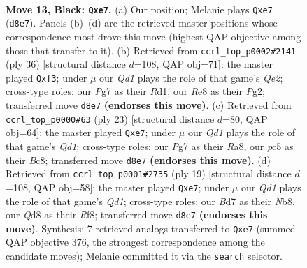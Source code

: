 \documentclass[11pt]{article}
\begin{document}
\begin{figure}[p]
\label{fig:thought-m23}
\end{figure}

\clearpage

\begin{figure}[p]\centering
\begin{subfigure}{0.46\textwidth}\centering
\resizebox{\linewidth}{!}{%
\newchessgame
\chessboard[
  setfen={r2qr1k1/1p1bBppp/p1n1p3/2Pp4/3Pn3/P1N2N1P/1P2BPP1/R2Q1RK1 b - - 0 13},
  showmover=false,
  pgfstyle=straightmove, color=movearrow, markmove={d8-e7}
]}
\caption{}
\end{subfigure}\hfill
\begin{subfigure}{0.46\textwidth}\centering
\resizebox{\linewidth}{!}{%
\newchessgame
\chessboard[
  setfen={2r1qrk1/4bppp/pn2pn2/1p2P3/3N4/P1N2bB1/1P2QPPP/R2R2K1 w - - 0 19},
  showmover=false,
  pgfstyle=straightmove, color=movearrow, markmove={e2-f3}
]}
\caption{}
\end{subfigure}
\\[4pt]
\begin{subfigure}{0.46\textwidth}\centering
\resizebox{\linewidth}{!}{%
\newchessgame
\chessboard[
  setfen={r1bq1rk1/pp2Bpp1/2n1p2p/2Pp4/3Pn3/P1N2N2/1P3PPP/2RQKB1R b K - 0 12},
  showmover=false,
  pgfstyle=straightmove, color=movearrow, markmove={d8-e7}
]}
\caption{}
\end{subfigure}\hfill
\begin{subfigure}{0.46\textwidth}\centering
\resizebox{\linewidth}{!}{%
\newchessgame
\chessboard[
  setfen={rn1q1rk1/pb2Bppp/1p2p3/2pn4/3P4/P1N1PN2/1P3PPP/2RQKB1R b K - 0 10},
  showmover=false,
  pgfstyle=straightmove, color=movearrow, markmove={d8-e7}
]}
\caption{}
\end{subfigure}
\caption{\textbf{Move 13, Black: \texttt{Qxe7}.} (a) Our position; Melanie plays \texttt{Qxe7} (\texttt{d8e7}). Panels (b)--(d) are the retrieved master positions whose correspondence most drove this move (highest QAP objective among those that transfer to it). (b) Retrieved from \texttt{ccrl\_top\_p0002\#2141} (ply 36) [structural distance $d$=108, QAP obj=71]: the master played \texttt{Qxf3}; under $\mu$ our \emph{Qd1} plays the role of that game's \emph{Qe2}; cross-type roles: our \emph{P}g7 as their \emph{R}d1, our \emph{R}e8 as their \emph{P}g2; transferred move \texttt{d8e7} \textbf{(endorses this move)}. (c) Retrieved from \texttt{ccrl\_top\_p0000\#63} (ply 23) [structural distance $d$=80, QAP obj=64]: the master played \texttt{Qxe7}; under $\mu$ our \emph{Qd1} plays the role of that game's \emph{Qd1}; cross-type roles: our \emph{P}g7 as their \emph{R}a8, our \emph{p}c5 as their \emph{B}c8; transferred move \texttt{d8e7} \textbf{(endorses this move)}. (d) Retrieved from \texttt{ccrl\_top\_p0001\#2735} (ply 19) [structural distance $d$=108, QAP obj=58]: the master played \texttt{Qxe7}; under $\mu$ our \emph{Qd1} plays the role of that game's \emph{Qd1}; cross-type roles: our \emph{B}d7 as their \emph{N}b8, our \emph{Q}d8 as their \emph{R}f8; transferred move \texttt{d8e7} \textbf{(endorses this move)}. Synthesis: 7 retrieved analogs transferred to \texttt{Qxe7} (summed QAP objective 376, the strongest correspondence among the candidate moves); Melanie committed it via the \texttt{search} selector.}

\end{figure}
\end{document}
